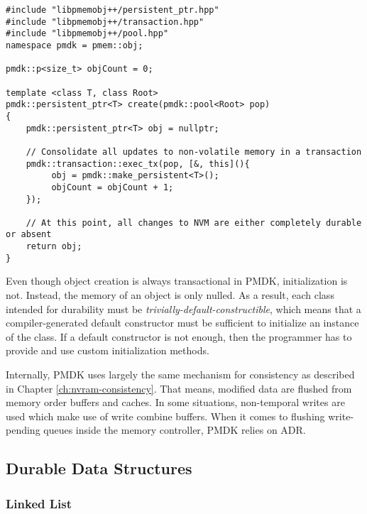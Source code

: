 \begin{lstlisting}
#include "libpmemobj++/persistent_ptr.hpp"
#include "libpmemobj++/transaction.hpp"
#include "libpmemobj++/pool.hpp"
namespace pmdk = pmem::obj;

pmdk::p<size_t> objCount = 0;

template <class T, class Root>
pmdk::persistent_ptr<T> create(pmdk::pool<Root> pop)
{
    pmdk::persistent_ptr<T> obj = nullptr;

    // Consolidate all updates to non-volatile memory in a transaction
    pmdk::transaction::exec_tx(pop, [&, this](){
         obj = pmdk::make_persistent<T>();
         objCount = objCount + 1;
    });

    // At this point, all changes to NVM are either completely durable or absent
    return obj;
}
\end{lstlisting}\label{lst:pmdk-tx}

Even though object creation is always transactional in PMDK, initialization is
not. Instead, the memory of an object is only nulled. As a result, each class
intended for durability must be \emph{trivially-default-constructible}, which
means that a compiler-generated default constructor must be sufficient to
initialize an instance of the class. If a default constructor is not enough,
then the programmer has to provide and use custom initialization methods.

Internally, PMDK uses largely the same mechanism for consistency as described in
Chapter \ref{ch:nvram-consistency}. That means, modified data are flushed from
memory order buffers and caches. In some situations, non-temporal writes are
used which make use of write combine buffers. When it comes to flushing
write-pending queues inside the memory controller, PMDK relies on ADR.


\subsection{Durable Data Structures}
\label{ch:impl-data}

\subsubsection{Linked List}

